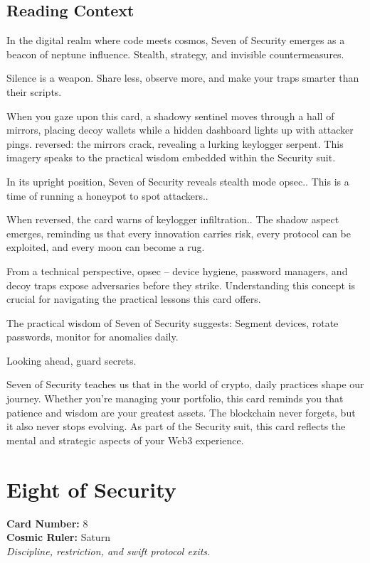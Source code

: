 \documentclass[11pt,oneside]{book}
\begin{document}
\begin{minipage}[t]{0.55\textwidth}
  \subsection*{Reading Context}
  In the digital realm where code meets cosmos, Seven of Security emerges as a beacon of neptune influence. Stealth, strategy, and invisible countermeasures.

  Silence is a weapon. Share less, observe more, and make your traps smarter than their scripts.

  When you gaze upon this card, a shadowy sentinel moves through a hall of mirrors, placing decoy wallets while a hidden dashboard lights up with attacker pings. reversed: the mirrors crack, revealing a lurking keylogger serpent. This imagery speaks to the practical wisdom embedded within the Security suit.

  In its upright position, Seven of Security reveals stealth mode opsec.. This is a time of running a honeypot to spot attackers..

  When reversed, the card warns of keylogger infiltration.. The shadow aspect emerges, reminding us that every innovation carries risk, every protocol can be exploited, and every moon can become a rug.

  From a technical perspective, opsec – device hygiene, password managers, and decoy traps expose adversaries before they strike. Understanding this concept is crucial for navigating the practical lessons this card offers.

  The practical wisdom of Seven of Security suggests: Segment devices, rotate passwords, monitor for anomalies daily.

  Looking ahead, guard secrets.

  Seven of Security teaches us that in the world of crypto, daily practices shape our journey. Whether you're managing your portfolio, this card reminds you that patience and wisdom are your greatest assets. The blockchain never forgets, but it also never stops evolving. As part of the Security suit, this card reflects the mental and strategic aspects of your Web3 experience.

\end{minipage}

\newpage
\section*{Eight of Security}

\begin{minipage}[t]{0.55\textwidth}
  \vspace{0pt}
  \textbf{Card Number:} 8\\  \textbf{Cosmic Ruler:} Saturn\\  \textit{Discipline, restriction, and swift protocol exits.}
\end{minipage}
\end{document}
